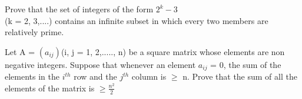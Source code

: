 \item Prove that the set of integers of the form $2^k - 3$\\
(k = 2, 3,....) contains an infinite subset in which every two members are relatively prime.\\
\item Let A = $(a_{ij})$(i, j = 1, 2,....., n) be a square matrix whose elements are non negative integers. Suppose that whenever an element $a_{ij}$ = 0, the sum of the
elements in the $i^{th}$ row and the $j^{th}$ column is $\geq$ n. Prove that the sum of
all the elements of the matrix is $\geq \frac{n^2}{2}$


